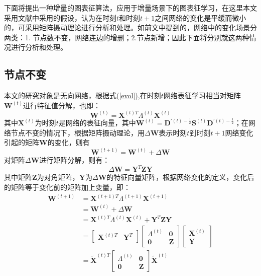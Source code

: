 下面将提出一种增量的图表征算法，应用于增量场景下的图表征学习，在这里本文采用文献\cite{chi2007evolutionary}中采用的假设，认为在时刻$t$和时刻$t+1$之间网络的变化是平缓而微小的，可采用矩阵摄动理论\cite{stewart1990matrix}进行分析和处理。如前文中提到的，网络中的变化场景分两类：1. 节点数不变，网络连边的增删；2.节点新增；因此下面将分别就这两种情况进行分析和处理。
\subsection{节点不变}
本文的研究对象是无向网络，根据式(\ref{evol}),在时刻$t$网络表征学习相当对矩阵$\textbf{W}^{(t)}$进行特征值分解，也即：
\begin{equation}
	\textbf{W}^{(t)} = \textbf{X}^{(t)T} \Lambda^{(t)} \textbf{X} ^{(t)}
\end{equation}
其中$\textbf{X} ^{(t)}$为时刻$t$是网络的表征向量，其中$\textbf{W}^{(t)} = \textbf{D}^{\prime(t)-\frac{1}{2}}\textbf{S}^{(t)}\textbf{D}^{\prime(t)-\frac{1}{2}}$；在网络节点不变的情况下，根据矩阵摄动理论\cite{stewart1990matrix}，用$\Delta\textbf{W}$表示时刻$t$到时刻$t+1$网络变化引起的矩阵$\textbf{W}$的变化，则有
\begin{equation}
	\textbf{W}^{(t+1)} = \textbf{W}^{(t)} + \Delta\textbf{W}
\end{equation}
对矩阵$\Delta\textbf{W}$进行矩阵分解，则有：
\begin{equation}
	\Delta\textbf{W} =  \textbf{Y}^{T} \textbf{Z}  \textbf{Y}
\end{equation}
其中矩阵$\textbf{Z}$为对角矩阵，$\textbf{Y}$为$\Delta\textbf{W}$的特征向量矩阵，根据网络变化的定义，变化后的矩阵等于变化前的矩阵加上变量，即：
\begin{equation}\label{time_t1}
\begin{aligned}
\textbf{W}^{(t+1)} &= \textbf{X}^{(t+1)T} \Lambda^{(t+1)} \textbf{X} ^{(t+1)} \\
 &= \textbf{W}^{(t)} + \Delta \textbf{W} \\
&= \textbf{X}^{(t)T} \Lambda^{(t)} \textbf{X} ^{(t)} +  \textbf{Y}^{T} \textbf{Z}  \textbf{Y} \\
&= \begin{bmatrix} \textbf{X}^{(t)T} & \textbf{Y}^{T}\end{bmatrix}
   \begin{bmatrix}  \Lambda^{(t)} & \textbf{0}\\
   \textbf{0} & \textbf{Z}
   \end{bmatrix}
   \begin{bmatrix} \textbf{X}^{(t)} \\ \textbf{Y}\end{bmatrix} \\
&= \tilde{\textbf{X}}^{(t)T} 
\begin{bmatrix}  \Lambda^{(t)} & \textbf{0}\\
\textbf{0} & \textbf{Z}
\end{bmatrix}
\tilde{\textbf{X}}^{(t)}
\end{aligned}
\end{equation}

